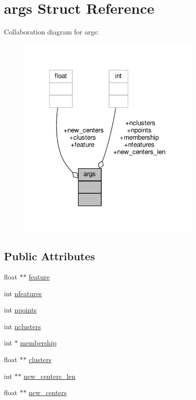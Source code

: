 \hypertarget{structargs}{\section{args Struct Reference}
\label{structargs}
}


Collaboration diagram for args\-:
\nopagebreak
\begin{figure}[H]
\begin{center}
\leavevmode
\includegraphics[width=257pt]{structargs__coll__graph}
\end{center}
\end{figure}
\subsection*{Public Attributes}
\begin{DoxyCompactItemize}
\item 
float $\ast$$\ast$ \hyperlink{structargs_a1d7a017444ee5b0780b67854c23759d2}{feature}
\item 
int \hyperlink{structargs_a796e94f2b850230a8fa07e7beca3172a}{nfeatures}
\item 
int \hyperlink{structargs_a74b8722e5cdb753bda0d3ca8d790da59}{npoints}
\item 
int \hyperlink{structargs_a0b3b50a055e6266c75b78c4298b0eb1c}{nclusters}
\item 
int $\ast$ \hyperlink{structargs_a347f2dfe89ab2b63543461552ccaa016}{membership}
\item 
float $\ast$$\ast$ \hyperlink{structargs_ac4305f4e6d9a31ad09cd2b2446113312}{clusters}
\item 
int $\ast$$\ast$ \hyperlink{structargs_a70fce814f4b524a2be8ce6110aea167a}{new\-\_\-centers\-\_\-len}
\item 
float $\ast$$\ast$ \hyperlink{structargs_a8cadab02e92b297690495ed58d5bcaec}{new\-\_\-centers}
\end{DoxyCompactItemize}



